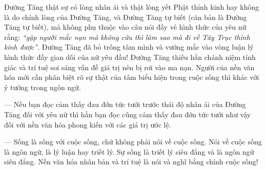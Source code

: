 Đường Tăng thật sự có lòng nhân ái và thật lòng yết Phật thỉnh kinh hay không là do chính lòng của Đường Tăng, và Đường Tăng tự biết (căn bản là Đường Tăng tự biết), mà không phụ thuộc vào câu nói đầy vẻ hình thức của yêu nữ rằng: \emph{``gặp người mắc nạn mà không cứu thì làm sao mà đi về Tây Trục thỉnh kinh được''}. Đường Tăng đã bỏ trống tâm mình và vướng mắc vào vòng luận lý hình thức đầy gian dối của nữ yêu đầu! Đường Tăng thiếu hẳn chánh niệm tỉnh giác và trí tuệ soi sáng vấn đề giá trị nên bị rơi vào ma nạn. Người của nền văn hóa mới cần phân biệt rõ sự thật của tâm biểu hiện trong cuộc sống thì khác với ý tưởng trong ngôn ngữ.

— Nếu bạn đọc cảm thấy đau đớn tức tưởi trước thái độ nhân ái của Đường Tăng đối với yêu nữ thì hẳn bạn đọc cũng cảm thấy đau đớn tức tưởi như vậy đối với nền văn hóa phong kiến với các giá trị ước lệ.

— Sống là sống với cuộc sống, chứ không phải nói về cuộc sống. Nói về cuộc sống là ngôn ngữ, là lý luận hay triết lý. Sự sống là triết lý siêu đẳng và là ngôn ngữ siêu đẳng. Nền văn hóa nhân bản và trí tuệ là nói và nghĩ bằng chính cuộc sống!
